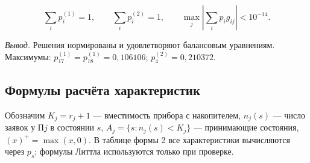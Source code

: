 \documentclass[12pt,a4paper]{article}
\newcommand{\concl}[1]{\par\noindent\textit{Вывод.} #1\par}
\begin{document}
\begin{equation*}
\sum_i p_i^{(1)}=1,\qquad\sum_i p_i^{(2)}=1,\qquad
\max_j\left|\sum_i p_i g_{ij}\right|<10^{-14}.
\end{equation*}
\concl{Решения нормированы и удовлетворяют балансовым уравнениям. Максимумы: $p_{17}^{(1)}=p_{18}^{(1)}=0{,}106106$; $p_4^{(2)}=0{,}210372$.}
\newpage

\subsection{Формулы расчёта характеристик}
Обозначим $K_j=r_j+1$ --- вместимость прибора с накопителем, $n_j(s)$ --- число заявок у П$j$ в состоянии $s$, $A_j=\{s:n_j(s)<K_j\}$ --- принимающие состояния, $(x)^+=\max(x,0)$.
В таблице формы 2 все характеристики вычисляются через $p_s$; формулы Литтла используются только при проверке.
\end{document}
